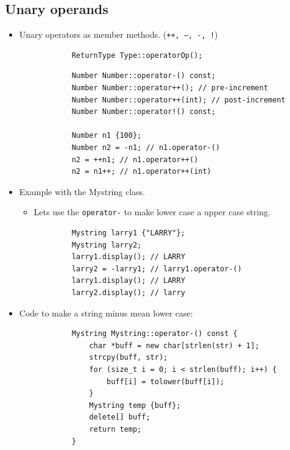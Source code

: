 \subsection{Unary operands}
\begin{itemize}
    \item Unary operators as member methods. (\texttt{++, --, -, !})
        \begin{verbatim}
            ReturnType Type::operatorOp();
        \end{verbatim}
        \begin{verbatim}
            Number Number::operator-() const;
            Number Number::operator++(); // pre-increment
            Number Number::operator++(int); // post-increment
            Number Number::operator!() const;

            Number n1 {100};
            Number n2 = -n1; // n1.operator-()
            n2 = ++n1; // n1.operator++()
            n2 = n1++; // n1.operator++(int)
        \end{verbatim}
    
    \item Example with the Mystring class.
        \begin{itemize}
            \item Lets use the \texttt{operator-} to make lower case a upper case string.
        \end{itemize}
        \begin{verbatim}
            Mystring larry1 {"LARRY"};
            Mystring larry2;
            larry1.display(); // LARRY 
            larry2 = -larry1; // larry1.operator-()
            larry1.display(); // LARRY 
            larry2.display(); // larry
        \end{verbatim}
    
    \item Code to make a string minus mean lower case:
        \begin{verbatim}
            Mystring Mystring::operator-() const {
                char *buff = new char[strlen(str) + 1];
                strcpy(buff, str);
                for (size_t i = 0; i < strlen(buff); i++) {
                    buff[i] = tolower(buff[i]);
                }
                Mystring temp {buff};
                delete[] buff;
                return temp;
            }
        \end{verbatim}
\end{itemize}

